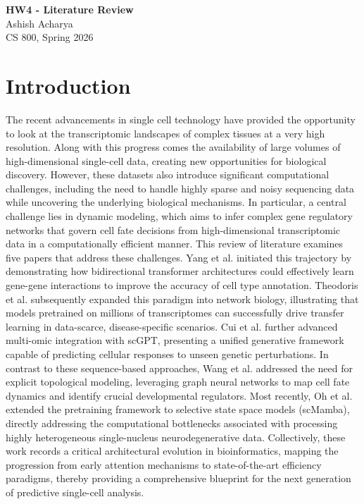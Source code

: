 \documentclass[12pt]{article}
\begin{document}
\begin{centering}
{\large\textbf{HW4 - Literature Review}}\\
\vspace{3mm} %
Ashish Acharya\\
CS 800, Spring 2026\\
\end{centering}



\section{Introduction}
The recent advancements in single cell technology have provided the opportunity to look at the transcriptomic landscapes of complex tissues at a very high resolution. Along with this progress comes the availability of large volumes of high-dimensional single-cell data, creating new opportunities for biological discovery. However, these datasets also introduce significant computational challenges, including the need to handle highly sparse and noisy sequencing data while uncovering the underlying biological mechanisms. In particular, a central challenge lies in dynamic modeling, which aims to infer complex gene regulatory networks that govern cell fate decisions from high-dimensional transcriptomic data in a computationally efficient manner. This review of literature examines five papers that address these challenges. Yang et al. \cite{yang2022scbert} initiated this trajectory by demonstrating how bidirectional transformer architectures could effectively learn gene-gene interactions to improve the accuracy of cell type annotation. Theodoris et al. \cite{theodoris2023transfer} subsequently expanded this paradigm into network biology, illustrating that models pretrained on millions of transcriptomes can successfully drive transfer learning in data-scarce, disease-specific scenarios. Cui et al. \cite{cui2024scgpt} further advanced multi-omic integration with scGPT, presenting a unified generative framework capable of predicting cellular responses to unseen genetic perturbations. In contrast to these sequence-based approaches, Wang et al. \cite{wang2023deciphering} addressed the need for explicit topological modeling, leveraging graph neural networks to map cell fate dynamics and identify crucial developmental regulators. Most recently, Oh et al. \cite{oh2025scmamba} extended the pretraining framework to selective state space models (scMamba), directly addressing the computational bottlenecks associated with processing highly heterogeneous single-nucleus neurodegenerative data. Collectively, these work records a critical architectural evolution in bioinformatics, mapping the progression from early attention mechanisms to state-of-the-art efficiency paradigms, thereby providing a comprehensive blueprint for the next generation of predictive single-cell analysis.
\end{document}
